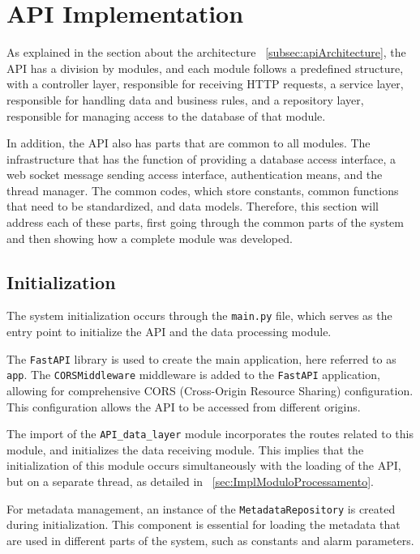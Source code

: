 
\section[API Implementation]{API Implementation}\label{sec:api}
As explained in the section about the architecture ~\ref{subsec:apiArchitecture}, the \gls{API} has a division by modules, and each module follows a predefined structure, with a controller layer, responsible for receiving \gls{HTTP} requests, a service layer, responsible for handling data and business rules, and a repository layer, responsible for managing access to the database of that module.

In addition, the \gls{API} also has parts that are common to all modules. The infrastructure that has the function of providing a database access interface, a web socket message sending access interface, authentication means, and the thread manager. The common codes, which store constants, common functions that need to be standardized, and data models.
Therefore, this section will address each of these parts, first going through the common parts of the system and then showing how a complete module was developed.

\subsection{Initialization}\label{subsec:main}
The system initialization occurs through the \texttt{main.py} file, which serves as the entry point to initialize the \gls{API} and the data processing module.

The \texttt{FastAPI} library \cite{fastapiDocs} is used to create the main application, here referred to as \texttt{app}. The \texttt{CORSMiddleware} middleware is added to the \texttt{FastAPI} application, allowing for comprehensive \gls{CORS} (Cross-Origin Resource Sharing) configuration. This configuration allows the \gls{API} to be accessed from different origins.

The import of the \texttt{API\_data\_layer} module incorporates the routes related to this module, and initializes the data receiving module. This implies that the initialization of this module occurs simultaneously with the loading of the \gls{API}, but on a separate thread, as detailed in ~\ref{sec:ImplModuloProcessamento}.

For metadata management, an instance of the \texttt{MetadataRepository} is created during initialization. This component is essential for loading the metadata that are used in different parts of the system, such as constants and alarm parameters.

